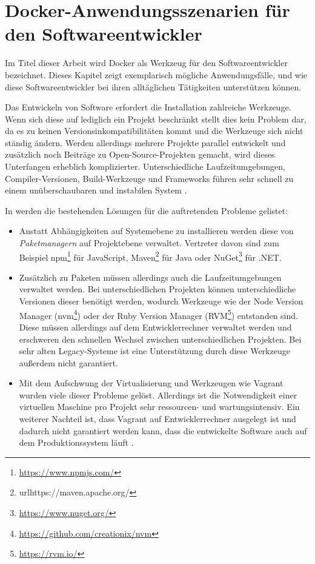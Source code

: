 \chapter{Docker-Anwendungsszenarien für den Softwareentwickler}
\label{cha:szenarien}
Im Titel dieser Arbeit wird Docker als Werkzeug für den Softwareentwickler bezeichnet.
Dieses Kapitel zeigt exemplarisch mögliche Anwendungsfälle, und wie diese Softwareentwickler bei ihren alltäglichen Tätigkeiten unterstützen können.

Das Entwickeln von Software erfordert die Installation zahlreiche Werkzeuge.
Wenn sich diese auf lediglich ein Projekt beschränkt stellt dies kein Problem dar, da es zu keinen Versionsinkompatibilitäten kommt und die Werkzeuge sich nicht ständig ändern.
Werden allerdings mehrere Projekte parallel entwickelt und zusätzlich noch Beiträge zu Open-Source-Projekten gemacht, wird dieses Unterfangen erheblich komplizierter.
Unterschiedliche Laufzeitumgebungen, Compiler-Versionen, Build-Werkzeuge und Frameworks führen sehr schnell zu einem unüberschaubaren und instabilen System \autocite{smashing-local-devenv-docker:online}.

In \autocite{smashing-local-devenv-docker:online} werden die bestehenden Lösungen für die auftretenden Probleme gelistet:
\begin{itemize}
    \item Anstatt Abhängigkeiten auf Systemebene zu installieren werden diese von \emph{Paketmanagern} auf Projektebene verwaltet.
    Vertreter davon sind zum Beispiel npm\footnote{\url{https://www.npmjs.com/}} für JavaScript, Maven\footnote{url{https://maven.apache.org/}} für Java oder NuGet\footnote{\url{https://www.nuget.org/}} für .NET.
    \item Zusätzlich zu Paketen müssen allerdings auch die Laufzeitumgebungen verwaltet werden.
    Bei unterschiedlichen Projekten können unterschiedliche Versionen dieser benötigt werden, wodurch Werkzeuge wie der Node Version Manager (nvm\footnote{\url{https://github.com/creationix/nvm}}) oder der Ruby Version Manager (RVM\footnote{\url{https://rvm.io/}}) entstanden sind.
    Diese müssen allerdings auf dem Entwicklerrechner verwaltet werden und erschweren den schnellen Wechsel zwischen unterschiedlichen Projekten.
    Bei sehr alten Legacy-Systeme ist eine Unterstützung durch diese Werkzeuge außerdem nicht garantiert.
    \item Mit dem Aufschwung der Virtualisierung und Werkzeugen wie Vagrant wurden viele dieser Probleme gelöst.
    Allerdings ist die Notwendigkeit einer virtuellen Maschine pro Projekt sehr ressourcen- und wartungsintensiv.
    Ein weiterer Nachteil ist, dass Vagrant auf Entwicklerrechner ausgelegt ist und dadurch nicht garantiert werden kann, dass die entwickelte Software auch auf dem Produktionssystem läuft \autocite{laradock-docs:online}.
\end{itemize}

